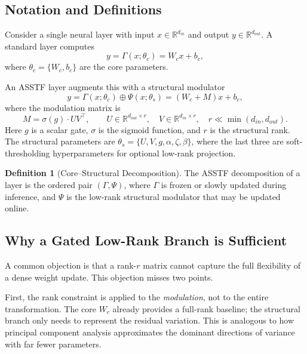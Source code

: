\documentclass[11pt,a4paper]{article}
\theoremstyle{definition}
\newtheorem{definition}{Definition}[section]
\begin{document}
\subsection{Notation and Definitions}
\label{subsec:notation}

Consider a single neural layer with input $x \in \mathbb{R}^{d_{in}}$ and output $y \in \mathbb{R}^{d_{out}}$. A standard layer computes
\begin{equation}
    y = \Gamma(x; \theta_c) = W_c x + b_c,
\end{equation}
where $\theta_c = \{W_c, b_c\}$ are the core parameters.

An ASSTF layer augments this with a structural modulator
\begin{equation}
    \label{eq:asstf_linear}
    y = \Gamma(x; \theta_c) \oplus \Psi(x; \theta_s)
    = (W_c + M) x + b_c,
\end{equation}
where the modulation matrix is
\begin{equation}
    M = \sigma(g) \cdot U V^{\top},
    \qquad
    U \in \mathbb{R}^{d_{out} \times r},
    \quad
    V \in \mathbb{R}^{d_{in} \times r},
    \quad
    r \ll \min(d_{in}, d_{out}).
\end{equation}
Here $g$ is a scalar gate, $\sigma$ is the sigmoid function, and $r$ is the structural rank. The structural parameters are $\theta_s = \{U, V, g, \alpha, \zeta, \beta\}$, where the last three are soft-thresholding hyperparameters for optional low-rank projection.

\begin{definition}[Core--Structural Decomposition]
    The ASSTF decomposition of a layer is the ordered pair $(\Gamma, \Psi)$, where $\Gamma$ is frozen or slowly updated during inference, and $\Psi$ is the low-rank structural modulator that may be updated online.
\end{definition}

\subsection{Why a Gated Low-Rank Branch is Sufficient}
\label{subsec:why_sufficient}

A common objection is that a rank-$r$ matrix cannot capture the full flexibility of a dense weight update. This objection misses two points.

First, the rank constraint is applied to the \textit{modulation}, not to the entire transformation. The core $W_c$ already provides a full-rank baseline; the structural branch only needs to represent the residual variation. This is analogous to how principal component analysis approximates the dominant directions of variance with far fewer parameters.
\end{document}
